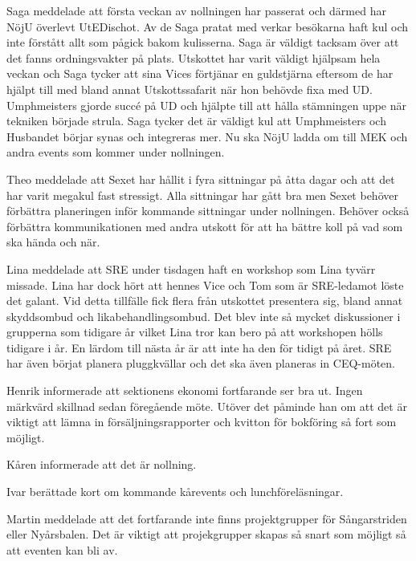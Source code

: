 \documentclass[10pt]{article}
\begin{document}
\begin{paragrafer}
\begin{paragrafer}
Saga meddelade att första veckan av nollningen har passerat och därmed har NöjU överlevt UtEDischot. Av de Saga pratat med verkar besökarna haft kul och inte förstått allt som pågick bakom kulisserna. Saga är väldigt tacksam över att det fanns ordningsvakter på plats.
Utskottet har varit väldigt hjälpsam hela veckan och Saga tycker att sina Vices förtjänar en guldstjärna eftersom de har hjälpt till med bland annat Utskottssafarit när hon behövde fixa med UD. Umphmeisters gjorde succé på UD och hjälpte till att hålla stämningen uppe när tekniken började strula. Saga tycker det är väldigt kul att Umphmeisters och Husbandet börjar synas och integreras mer. Nu ska NöjU ladda om till MEK och andra events som kommer under nollningen. 

Theo meddelade att Sexet har hållit i fyra sittningar på åtta dagar och att det har varit megakul fast stressigt. Alla sittningar har gått bra men Sexet behöver förbättra planeringen inför kommande sittningar under nollningen. Behöver också förbättra kommunikationen med andra utskott för att ha bättre koll på vad som ska hända och när. 

Lina meddelade att SRE under tisdagen haft en workshop som Lina tyvärr missade. Lina har dock hört att hennes Vice och Tom som är SRE-ledamot löste det galant. Vid detta tillfälle fick flera från utskottet presentera sig, bland annat skyddsombud och likabehandlingsombud. 
Det blev inte så mycket diskussioner i grupperna som tidigare år vilket Lina tror kan bero på att workshopen hölls tidigare i år. En lärdom till nästa år är att inte ha den för tidigt på året. 
SRE har även börjat planera pluggkvällar och det ska även planeras in CEQ-möten. 



Henrik informerade att sektionens ekonomi fortfarande ser bra ut. Ingen märkvärd skillnad sedan föregående möte. Utöver det påminde han om att det är viktigt att lämna in försäljningsrapporter och kvitton för bokföring så fort som möjligt. 

 

Kåren informerade att det är nollning. 

Ivar berättade kort om kommande kårevents och lunchföreläsningar.

Martin meddelade att det fortfarande inte finns projektgrupper för Sångarstriden eller Nyårsbalen. Det är viktigt att projekgrupper skapas så snart som möjligt så att eventen kan bli av.


\end{paragrafer}
\end{paragrafer}
\end{document}
